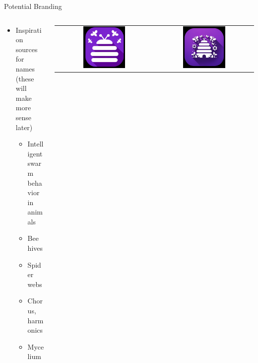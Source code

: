 \documentclass[aspectratio=169]{beamer}
\begin{document}
\begin{frame}{Potential Branding}
\begin{columns}[T]
    \begin{column}[T]{0.5\textwidth}
        \begin{itemize}
            \item Inspiration sources for names (these will make more sense later)
            \begin{itemize}
                \item Intelligent swarm behavior in animals
                \item Bee hives
                \item Spider webs
                \item Chorus, harmonics
                \item Mycelium
            \end{itemize}
        \end{itemize}
    \end{column}
    \begin{column}{0.5\textwidth}
        \begin{tabular}{cc}
            \includegraphics[width=0.45\textwidth]{imgs/app_icons/1.png} & \includegraphics[width=0.45\textwidth]{imgs/app_icons/2.png} \\ 

\end{tabular}
\end{column}
\end{columns}
\end{frame}
\end{document}

